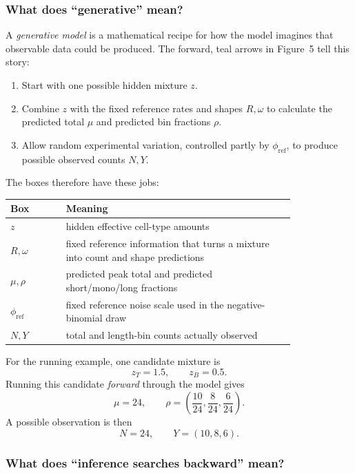 \documentclass[11pt]{article}
\begin{document}
\subsubsection*{What does “generative” mean?}

A \emph{generative model} is a mathematical recipe for how the model imagines
that observable data could be produced.  The forward, teal arrows in Figure~5
tell this story:

\begin{enumerate}[leftmargin=2em]
  \item Start with one possible hidden mixture \(z\).
  \item Combine \(z\) with the fixed reference rates and shapes \(R,\omega\) to
  calculate the predicted total \(\mu\) and predicted bin fractions \(\rho\).
  \item Allow random experimental variation, controlled partly by
  \(\phi_{\mathrm{ref}}\), to produce possible observed counts \(N,Y\).
\end{enumerate}

The boxes therefore have these jobs:

\begin{center}
\begin{tabular}{C{0.16\linewidth}L{0.66\linewidth}}
\toprule
Box & Meaning \\
\midrule
\(z\) & hidden effective cell-type amounts \\
\(R,\omega\) & fixed reference information that turns a mixture into count and shape predictions \\
\(\mu,\rho\) & predicted peak total and predicted short/mono/long fractions \\
\(\phi_{\mathrm{ref}}\) & fixed reference noise scale used in the negative-binomial draw \\
\(N,Y\) & total and length-bin counts actually observed \\
\bottomrule
\end{tabular}
\end{center}

For the running example, one candidate mixture is
\[
z_T=1.5,\qquad z_B=0.5.
\]
Running this candidate \emph{forward} through the model gives
\[
\mu=24,
\qquad
\rho=\left(\frac{10}{24},\frac{8}{24},\frac{6}{24}\right).
\]
A possible observation is then
\[
N=24,
\qquad
Y=(10,8,6).
\]

\subsubsection*{What does “inference searches backward” mean?}
\end{document}
